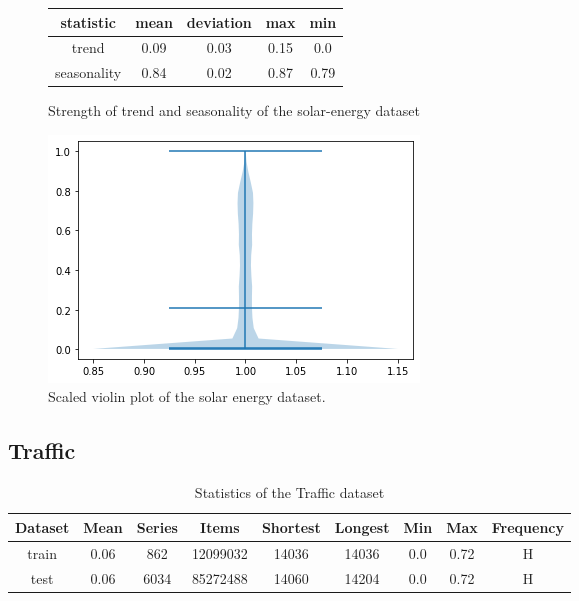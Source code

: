 \begin{figure}[htb]
  \centering
  \begin{center}
    \begin{tabular}{||c | c | c | c | c |}
      \hline
      statistic   & mean & deviation & max  & min  \\
      \hline
      trend       & 0.09 & 0.03      & 0.15 & 0.0  \\
      \hline
      seasonality & 0.84 & 0.02      & 0.87 & 0.79 \\
      \hline
      \hline
    \end{tabular}
    \caption{Strength of trend and seasonality of the solar-energy dataset}
  \end{center}
  \endminipage\hfill
  \includegraphics[width=\linewidth]{./img/solar-energy_violin.png}
  \caption{Scaled violin plot of the solar energy dataset.}
  \label{fig:solar-energy_violin}
  \endminipage\hfill
\end{figure}

\clearpage
\subsection{Traffic}

\begin{table}[htb]
  \begin{tabular}{||c | c c c c c c c c ||}
    \hline
    Dataset & Mean & Series & Items    & Shortest & Longest & Min & Max  & Frequency \\ [0.5ex]
    \hline\hline
    train   & 0.06 & 862    & 12099032 & 14036    & 14036   & 0.0 & 0.72 & H         \\
    \hline
    test    & 0.06 & 6034   & 85272488 & 14060    & 14204   & 0.0 & 0.72 & H         \\
    \hline
  \end{tabular}
  \caption{Statistics of the Traffic dataset}
\end{table}

